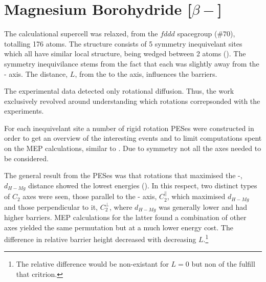 \section{Magnesium Borohydride [$\beta-$]}
\label{sec:borohydrides-magnesium}


The calculational supercell was relaxed, from the $fddd$ spacegroup ($\#70$), totalling 176 atoms.
The structure consists of 5 symmetry inequivelant  sites which all have similar local structure, being wedged between 2  atoms ().
The symmetry inequivilance stems from the fact that each  was slightly away from the - axis.
The distance, $L$, from the  to the axis, influences the barriers.


The experimental data detected only rotational diffusion.
Thus, the work exclusively revolved around understanding which rotations correpsonded with the experiments.

For each inequivelant site a number of rigid rotation PESes were constructed in order to get an overview of the interesting events and to limit computations spent on the MEP calculations, similar to .
Due to symmetry not all the axes needed to be considered.

The general result from the PESes was that rotations that maximised the -, $d_{H-Mg}$ distance showed the lowest energies ().
In this respect, two distinct types of $C_2$ axes were seen, those parallel to the - axis, $C_2^\parallel$, which maximised $d_{H-Mg}$ and those perpendicular to it, $C_2^\perp$, where $d_{H-Mg}$ was generally lower and had higher barriers.
MEP calculations for the latter found a combination of other axes yielded the same permutation but at a much lower energy cost.
The difference in relative barrier height decreased with decreasing $L$.\footnote{The relative difference would be non-existant for $L=0$ but non of the  fulfill that critrion.}

